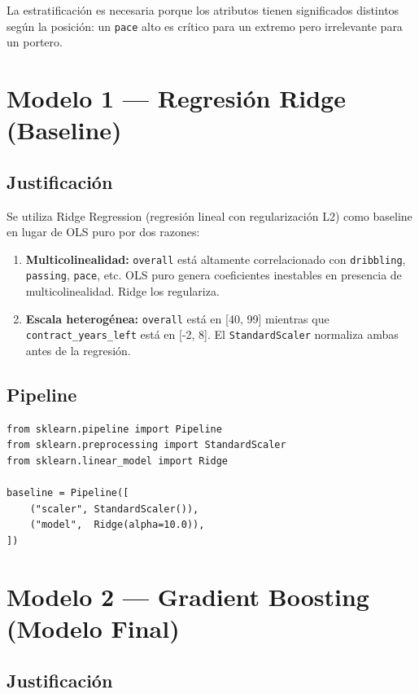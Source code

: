 \documentclass[12pt,a4paper]{report}
\begin{document}
La estratificación es necesaria porque los atributos tienen significados distintos según la posición: un \texttt{pace} alto es crítico para un extremo pero irrelevante para un portero.

\section{Modelo 1 --- Regresión Ridge (Baseline)}

\subsection{Justificación}

Se utiliza Ridge Regression (regresión lineal con regularización L2) como baseline en lugar de OLS puro por dos razones:

\begin{enumerate}
  \item \textbf{Multicolinealidad:} \texttt{overall} está altamente correlacionado con \texttt{dribbling}, \texttt{passing}, \texttt{pace}, etc. OLS puro genera coeficientes inestables en presencia de multicolinealidad. Ridge los regulariza.
  \item \textbf{Escala heterogénea:} \texttt{overall} está en [40, 99] mientras que \texttt{contract\_years\_left} está en [-2, 8]. El \texttt{StandardScaler} normaliza ambas antes de la regresión.
\end{enumerate}

\subsection{Pipeline}

\begin{lstlisting}[caption={Pipeline de regresión Ridge}]
from sklearn.pipeline import Pipeline
from sklearn.preprocessing import StandardScaler
from sklearn.linear_model import Ridge

baseline = Pipeline([
    ("scaler", StandardScaler()),
    ("model",  Ridge(alpha=10.0)),
])
\end{lstlisting}

\section{Modelo 2 --- Gradient Boosting (Modelo Final)}

\subsection{Justificación}
\end{document}
